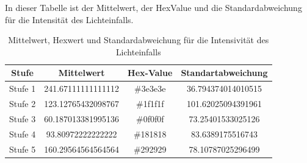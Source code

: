 \documentclass[12pt, oneside, a4paper, \docLanguage]{report}
\begin{document}
In dieser Tabelle ist der Mittelwert, der HexValue und die Standardabweichung für die Intensität des Lichteinfalls.
\begin{table}[H]
	\centering\small
	\begin{tabular}{|c|c|c|c|}
	\hline
	Stufe & Mittelwert & Hex-Value & Standartabweichung \\
	\hline
	Stufe 1 & 241.67111111111112 & \#3e3e3e & 36.794374014010515 \\
	\hline
	Stufe 2 & 123.12765432098767 & \#1f1f1f & 101.62025094391961 \\
	\hline
	Stufe 3 & 60.187013381995136 & \#0f0f0f & 73.25401533025126 \\
	\hline
	Stufe 4 & 93.80972222222222 & \#181818 & 83.6389175516743 \\
	\hline
	Stufe 5 & 160.29564564564564 & \#292929 & 78.10787025296499 \\
	\hline
	\end{tabular}
	\caption{Mittelwert, Hexwert und Standardabweichung für die Intensivität des Lichteinfalls}
	\label{fig:VERSUCH_4_MESSWERTE}
\end{table}

\newpage
\end{document}
